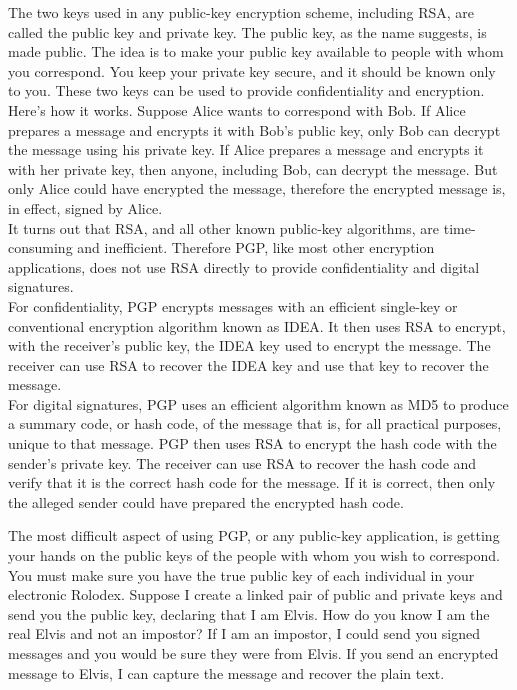 \begin{htmllist}
    The two keys used in any public-key encryption scheme, including RSA,
    are called the public key and private key. The public key, as the name
    suggests, is made public. The idea is to make your public key available
    to people with whom you correspond. You keep your private key secure,
    and it should be known only to you. These two keys can be used to
    provide confidentiality and encryption.\\
    
    Here's how it works. Suppose Alice wants to correspond with Bob. If
    Alice prepares a message and encrypts it with Bob's public key, only
    Bob can decrypt the message using his private key. If Alice prepares a
    message and encrypts it with her private key, then anyone, including
    Bob, can decrypt the message. But only Alice could have encrypted the
    message, therefore the encrypted message is, in effect, signed by Alice.\\
    
    It turns out that RSA, and all other known public-key algorithms, are
    time-consuming and inefficient. Therefore PGP, like most other
    encryption applications, does not use RSA directly to provide
    confidentiality and digital signatures.\\
    
    For confidentiality, PGP encrypts messages with an efficient single-key
    or conventional encryption algorithm known as IDEA. It then uses RSA to
    encrypt, with the receiver's public key, the IDEA key used to encrypt
    the message. The receiver can use RSA to recover the IDEA key and use
    that key to recover the message.\\
    
    For digital signatures, PGP uses an efficient algorithm known as MD5 to
    produce a summary code, or hash code, of the message that is, for all
    practical purposes, unique to that message. PGP then uses RSA to
    encrypt the hash code with the sender's private key. The receiver can
    use RSA to recover the hash code and verify that it is the correct hash
    code for the message. If it is correct, then only the alleged sender
    could have prepared the encrypted hash code.\\

    
    The most difficult aspect of using PGP, or any public-key application,
    is getting your hands on the public keys of the people with whom you
    wish to correspond. You must make sure you have the true public key of
    each individual in your electronic Rolodex. Suppose I create a linked
    pair of public and private keys and send you the public key, declaring
    that I am Elvis. How do you know I am the real Elvis and not an
    impostor? If I am an impostor, I could send you signed messages and you
    would be sure they were from Elvis. If you send an encrypted message to
    Elvis, I can capture the message and recover the plain text.\\
    

\end{htmllist}

